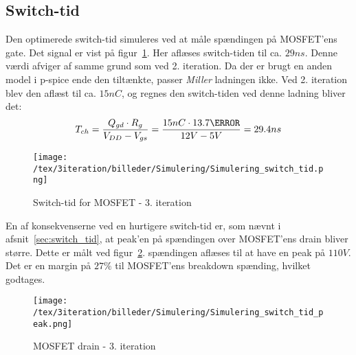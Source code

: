 
\subsection{Switch-tid}
Den optimerede switch-tid simuleres ved at måle spændingen på MOSFET'ens gate. Det signal er vist på figur~\ref{fig:switch_tid_3}. Her aflæses switch-tiden til ca. $29ns$. Denne værdi afviger af samme grund som ved 2. iteration. Da der er brugt en anden model i p-spice ende den tiltænkte, passer \textit{Miller} ladningen ikke. Ved 2. iteration blev den aflæst til ca. $15nC$, og regnes den switch-tiden ved denne ladning bliver det:
\begin{equation} 
T_{ch} = \frac{Q_{gd} \cdot R_{g}}{V_{DD}-V_{gs}} = \frac{15nC \cdot 13.7\ohm}{12V-5V} = 29.4ns
\end{equation}

\begin{figure}[H]
	\center
	\texttt{[image: /tex/3iteration/billeder/Simulering/Simulering\_switch\_tid.png]}
	\caption{Switch-tid for MOSFET - 3. iteration}
	\label{fig:switch_tid_3}
\end{figure}

\noindent En af konsekvenserne ved en hurtigere switch-tid er, som nævnt i afsnit~\ref{sec:switch_tid}, at peak'en på spændingen over MOSFET'ens drain bliver større. Dette er målt ved figur~\ref{fig:switch_tid_peak}. spændingen aflæses til at have en peak på $110V$. Det er en margin på $27\percent$ til MOSFET'ens breakdown spænding, hvilket godtages. 

\begin{figure}[H]
	\center
	\texttt{[image: /tex/3iteration/billeder/Simulering/Simulering\_switch\_tid\_peak.png]}
	\caption{MOSFET drain - 3. iteration}
	\label{fig:switch_tid_peak}
\end{figure}